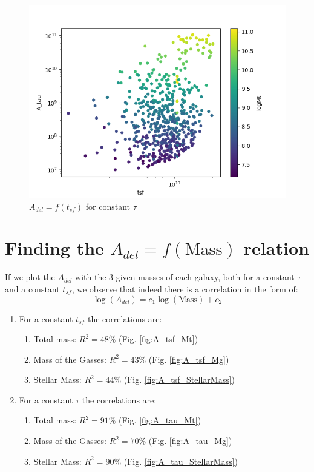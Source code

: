 \documentclass[a4paper,twocolumn]{article}
\begin{document}
\begin{figure}[!htpb]
\centering
\includegraphics[width=.9\linewidth]{./figs/T-A_tau.png}
\caption{\label{fig:A-tsf_tau}\(A_{del} = f(t_{sf})\) for constant \(\tau\)}
\end{figure}

\section{Finding the \(A_{del} = f(\text{Mass})\) relation}
\label{sec:orgb5ebed2}

If we plot the \(A_{del}\) with the 3 given masses of each galaxy, both for a constant \(\tau\) and a constant \(t_{sf}\), we observe that indeed there is a correlation in the form of:
$$
\log(A_{del}) = c_1\log(\text{Mass})+c_2
$$

\begin{enumerate}
\item For a constant \(t_{sf}\) the correlations are:
\begin{enumerate}
\item Total mass: \(R^2=48\%\) (Fig. \ref{fig:A_tsf_Mt})
\item Mass of the Gasses: \(R^2=43\%\) (Fig. \ref{fig:A_tsf_Mg})
\item Stellar Mass: \(R^2=44\%\) (Fig. \ref{fig:A_tsf_StellarMass})
\end{enumerate}

\item For a constant \(\tau\) the correlations are:
\begin{enumerate}
\item Total mass: \(R^2=91\%\) (Fig. \ref{fig:A_tau_Mt})
\item Mass of the Gasses: \(R^2=70\%\) (Fig. \ref{fig:A_tau_Mg})
\item Stellar Mass: \(R^2=90\%\) (Fig. \ref{fig:A_tau_StellarMass})
\end{enumerate}
\end{enumerate}
\end{document}
